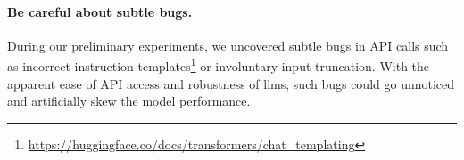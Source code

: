 \paragraph{Be careful about subtle bugs.} During our preliminary experiments, we uncovered subtle bugs in API calls such as incorrect instruction templates\footnote{\url{https://huggingface.co/docs/transformers/chat_templating}} or involuntary input truncation. With the apparent ease of API access and robustness of \acp{llm}, such bugs could go unnoticed and artificially skew the model performance.




